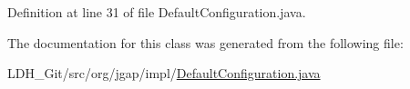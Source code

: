 Definition at line 31 of file Default\-Configuration.\-java.



The documentation for this class was generated from the following file\-:\begin{DoxyCompactItemize}
\item 
L\-D\-H\-\_\-\-Git/src/org/jgap/impl/\hyperlink{_default_configuration_8java}{Default\-Configuration.\-java}\end{DoxyCompactItemize}

